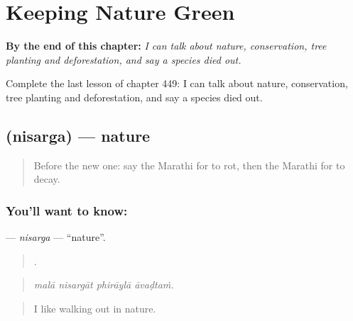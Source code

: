 
\chapter{Keeping Nature Green}
\label{ch:mr-keeping-nature-green}

\begin{chapteropening}
\textbf{By the end of this chapter:} \emph{I can talk about nature, conservation, tree planting and deforestation, and say a species died out.}

Complete the last lesson of chapter 449: I can talk about nature, conservation, tree planting and deforestation, and say a species died out.
\end{chapteropening}

\section[\texorpdfstring{\mr{निसर्ग} (nisarga)}{निसर्ग (nisarga)}]{ (nisarga) — nature}

\label{lesson:MR-C449-nisarga}



\begin{quote}
Before the new one: say the Marathi for to rot, then the Marathi for to decay.
\end{quote}

\subsection*{You'll want to know: }
\textbf{} — \emph{nisarga} — \textquotedblleft{}nature\textquotedblright{}.

\begin{quote}
   .
\end{quote}

\begin{quote}
\emph{malā nisargāt phirāylā āvaḍtaṁ.}
\end{quote}

\begin{quote}
I like walking out in nature.
\end{quote}

